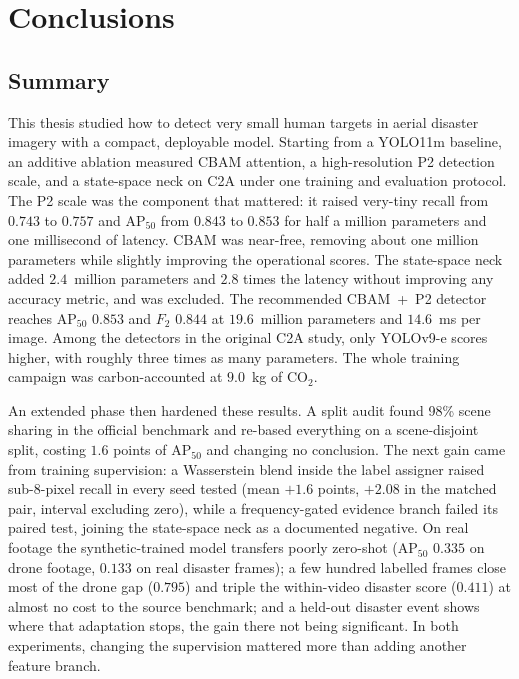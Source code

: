 \chapter{Conclusions}

\section{Summary}
This thesis studied how to detect very small human targets in aerial disaster
imagery with a compact, deployable model. Starting from a YOLO11m
baseline, an additive ablation measured CBAM attention, a high-resolution P2
detection scale, and a state-space neck on C2A under one training and
evaluation protocol. The P2 scale was the component
that mattered: it raised very-tiny recall from $0.743$ to $0.757$ and
$\mathrm{AP}_{50}$ from $0.843$ to $0.853$ for half a million
parameters and one millisecond of latency. CBAM was near-free, removing about
one million parameters while slightly improving the operational scores. The
state-space neck added $2.4$~million parameters and $2.8$ times the latency
without improving any accuracy metric, and was excluded. The
recommended CBAM~+~P2 detector reaches $\mathrm{AP}_{50}$ $0.853$ and $F_2$
$0.844$ at $19.6$~million parameters and $14.6$~ms per image. Among the
detectors in the original C2A study, only YOLOv9-e scores higher, with
roughly three times as many parameters. The whole
training campaign was carbon-accounted at $9.0$~kg of CO$_2$.

An extended phase then hardened these results. A split audit found 98\% scene
sharing in the official benchmark and re-based everything on a scene-disjoint
split, costing $1.6$ points of $\mathrm{AP}_{50}$ and changing no conclusion.
The next gain came from training
supervision: a Wasserstein blend inside the label assigner raised sub-8-pixel
recall in every seed tested (mean $+1.6$ points, $+2.08$ in the matched pair,
interval excluding zero), while a frequency-gated evidence branch failed its
paired test, joining the state-space neck as a documented negative. On real
footage the synthetic-trained model transfers poorly
zero-shot ($\mathrm{AP}_{50}$ $0.335$ on drone footage, $0.133$ on real
disaster frames); a few hundred labelled frames close most of the drone gap
($0.795$) and triple the within-video disaster score ($0.411$) at almost no
cost to the source benchmark; and a held-out disaster event shows where that
adaptation stops, the gain there not being significant. In both experiments,
changing the supervision mattered more than adding another feature branch.

